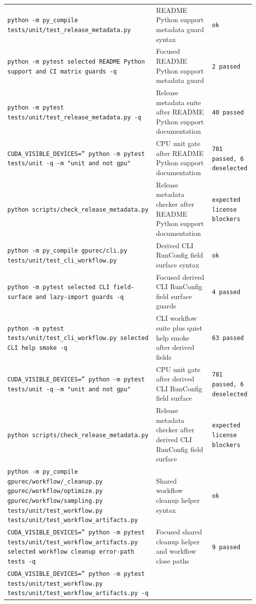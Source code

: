\documentclass[11pt]{article}
\begin{document}
\begin{center}
\begin{tabular}{lll}
\texttt{python -m py\_compile tests/unit/test\_release\_metadata.py} &
README Python support metadata guard syntax &
\texttt{ok} \\
\texttt{python -m pytest selected README Python support and CI matrix guards -q} &
Focused README Python support metadata guard &
\texttt{2 passed} \\
\texttt{python -m pytest tests/unit/test\_release\_metadata.py -q} &
Release metadata suite after README Python support documentation &
\texttt{40 passed} \\
\texttt{CUDA\_VISIBLE\_DEVICES='' python -m pytest tests/unit -q -m "unit and not gpu"} &
CPU unit gate after README Python support documentation &
\texttt{781 passed, 6 deselected} \\
\texttt{python scripts/check\_release\_metadata.py} &
Release metadata checker after README Python support documentation &
\texttt{expected license blockers} \\
\texttt{python -m py\_compile gpurec/cli.py tests/unit/test\_cli\_workflow.py} &
Derived CLI RunConfig field surface syntax &
\texttt{ok} \\
\texttt{python -m pytest selected CLI field-surface and lazy-import guards -q} &
Focused derived CLI RunConfig field surface guards &
\texttt{4 passed} \\
\texttt{python -m pytest tests/unit/test\_cli\_workflow.py selected CLI help smoke -q} &
CLI workflow suite plus quiet help smoke after derived fields &
\texttt{63 passed} \\
\texttt{CUDA\_VISIBLE\_DEVICES='' python -m pytest tests/unit -q -m "unit and not gpu"} &
CPU unit gate after derived CLI RunConfig field surface &
\texttt{781 passed, 6 deselected} \\
\texttt{python scripts/check\_release\_metadata.py} &
Release metadata checker after derived CLI RunConfig field surface &
\texttt{expected license blockers} \\
\texttt{python -m py\_compile gpurec/workflow/\_cleanup.py gpurec/workflow/optimize.py gpurec/workflow/sampling.py tests/unit/test\_workflow.py tests/unit/test\_workflow\_artifacts.py} &
Shared workflow cleanup helper syntax &
\texttt{ok} \\
\texttt{CUDA\_VISIBLE\_DEVICES='' python -m pytest tests/unit/test\_workflow\_artifacts.py selected workflow cleanup error-path tests -q} &
Focused shared cleanup helper and workflow close paths &
\texttt{9 passed} \\
\texttt{CUDA\_VISIBLE\_DEVICES='' python -m pytest tests/unit/test\_workflow.py tests/unit/test\_workflow\_artifacts.py -q} &

\end{tabular}
\end{center}
\end{document}
